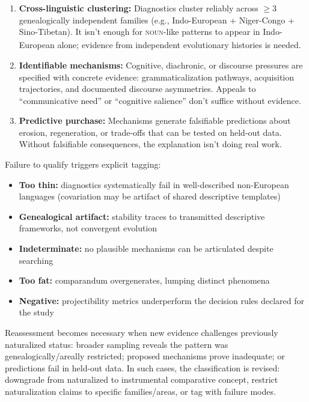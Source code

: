 \documentclass[12pt]{article}
\begin{document}
\begin{enumerate}
\item \textbf{Cross-linguistic clustering:} Diagnostics cluster reliably across $\geq 3$ genealogically independent families (e.g., Indo-European + Niger-Congo + Sino-Tibetan). It isn't enough for \textsc{noun}\textsubscript{\Cross}-like patterns to appear in Indo-European alone; evidence from independent evolutionary histories is needed.
\item \textbf{Identifiable mechanisms:} Cognitive, diachronic, or discourse pressures are specified with concrete evidence: grammaticalization pathways, acquisition trajectories, and documented discourse asymmetries. Appeals to \enquote{communicative need} or \enquote{cognitive salience} don't suffice without evidence.
\item \textbf{Predictive purchase:} Mechanisms generate falsifiable predictions about erosion, regeneration, or trade-offs that can be tested on held-out data. Without falsifiable consequences, the explanation isn't doing real work.
\end{enumerate}

Failure to qualify triggers explicit tagging:
\begin{itemize}
\item \textbf{Too thin:} diagnostics systematically fail in well-described non-European languages (covariation may be artifact of shared descriptive templates)
\item \textbf{Genealogical artifact:} stability traces to transmitted descriptive frameworks, not convergent evolution
\item \textbf{Indeterminate:} no plausible mechanisms can be articulated despite searching
\item \textbf{Too fat:} comparandum overgenerates, lumping distinct phenomena
\item \textbf{Negative:} projectibility metrics underperform the decision rules declared for the study
\end{itemize}

Reassessment becomes necessary when new evidence challenges previously naturalized status: broader sampling reveals the pattern was genealogically/areally restricted; proposed mechanisms prove inadequate; or predictions fail in held-out data. In such cases, the classification is revised: downgrade from naturalized to instrumental comparative concept, restrict naturalization claims to specific families/areas, or tag with failure modes.
\end{document}
